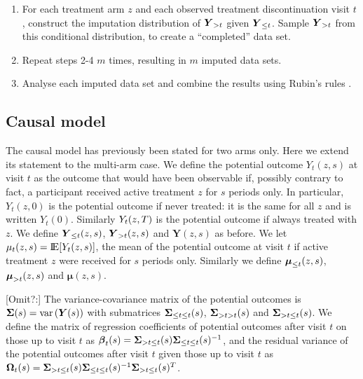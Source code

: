 \begin{enumerate}
\item For each treatment arm $z$ and each observed treatment discontinuation visit $t$, construct the imputation distribution of  $\boldsymbol{Y}_{{>t}}$ given  $\boldsymbol{Y}_{{\le{t}}}$. 
Sample $\boldsymbol{Y}_{{>t}}$ from this   conditional distribution, to create a “completed” data set.

\item Repeat steps 2-4 $m$ times, resulting in $m$ imputed data sets.

\item Analyse each imputed data set and combine the results using Rubin's rules \citep{Rubin87}.

\end{enumerate}



\subsection{Causal model}

The causal model has previously been stated for two arms only. Here we extend its statement to the multi-arm case. 
We define the potential outcome $Y_t(z,s)$ at visit $t$ as the outcome that would have been observable if, possibly contrary to fact, a participant received active treatment $z$ for $s$ periods only.
In particular, $Y_t(z,0)$ is the potential outcome if never treated: it is the same for all $z$ and is written $Y_t(0)$. Similarly $Y_t(z,T)$ is the potential outcome if always treated with $z$.
We define 
$\boldsymbol{Y}_{{\le{t}}}(z,s)$, $\boldsymbol{Y}_{{>t}}(z,s)$ and $\boldsymbol{Y}(z,s)$ as before.
We let 
$\mu_t(z,s) = \E[Y_t(z,s)]$, the mean of the potential outcome at visit $t$ if active treatment $z$ were received for $s$ periods only. Similarly we define 
$\boldsymbol{\mu}_{\le{t}}(z,s)$, $\boldsymbol{\mu}_{>t}(z,s)$ and $\boldsymbol{\mu}(z,s)$.

[Omit?:] 
The variance-covariance matrix  of the potential  outcomes is $\boldsymbol{\Sigma}(s)={\rm var}\left(\boldsymbol{Y}(s)\right)$ with submatrices 
$\boldsymbol{\Sigma}_{{\le{t}}{\le{t}}}(s)$,
$\boldsymbol{\Sigma}_{{>t}{>t}}(s)$ and
$\boldsymbol{\Sigma}_{{>t}{\le{t}}}(s)$.
We define 
the matrix of regression coefficients of  potential outcomes after visit  $t$ on those up to visit  $t$
as $\boldsymbol{\beta}_t(s) = \boldsymbol{\Sigma}_{{>t}{\le{t}}}(s) \boldsymbol{\Sigma}_{{\le{t}}{\le{t}}}(s)^{-1}$, and 
the residual variance of the potential outcomes after visit  $t$ given those up to visit  $t$ as
$\boldsymbol{\Omega}_t(s) = \boldsymbol{\Sigma}_{{>t}{\le{t}}}(s)
\boldsymbol{\Sigma}_{{\le{t}}{\le{t}}}(s)^{-1}
\boldsymbol{\Sigma}_{{>t}{\le{t}}}(s)^T$.


